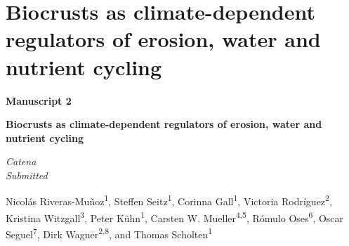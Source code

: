 \chapter{Biocrusts as climate-dependent regulators of erosion, water and nutrient cycling}
\label{chap:manuscript2} %

\begin{center}
  \textbf{\Large Manuscript 2}
\end{center}

\vspace{0.1cm}

\begin{center}
  \textbf{\huge Biocrusts as climate-dependent regulators of erosion, water and nutrient cycling}
\end{center}

\vspace{0.2cm}

\begin{center}
  \textit{Catena}\\
  \textit{Submitted}
\end{center}
\vspace{0.1cm}

\begin{justify}
  Nicolás Riveras-Muñoz\textsuperscript{1}, Steffen Seitz\textsuperscript{1}, Corinna Gall\textsuperscript{1}, Victoria Rodríguez\textsuperscript{2}, Kristina Witzgall\textsuperscript{3}, Peter Kühn\textsuperscript{1}, Carsten W. Mueller\textsuperscript{4,5}, Rómulo Oses\textsuperscript{6}, Oscar Seguel\textsuperscript{7}, Dirk Wagner\textsuperscript{2,8}, and Thomas Scholten\textsuperscript{1}
\end{justify}

\vspace{0.2cm}

